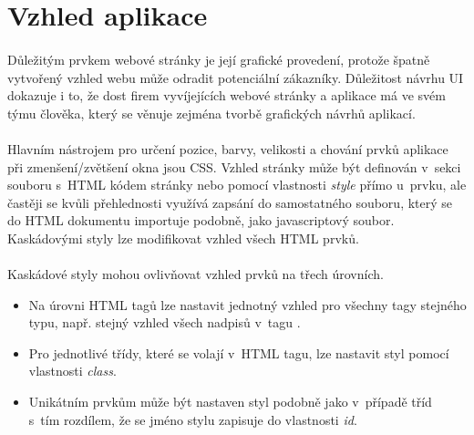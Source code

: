 \documentclass[11pt,a4paper,titlepage,oneside]{book}
\begin{document}

	\section{Vzhled aplikace}



		\paragraph{} Důležitým prvkem webové stránky je její grafické provedení, protože špatně vytvořený vzhled webu může odradit potenciální zákazníky. Důležitost návrhu \ac{UI} dokazuje i to, že dost firem vyvíjejících webové stránky a aplikace má ve svém týmu člověka, který se věnuje zejména tvorbě grafických návrhů aplikací.


		\paragraph{} Hlavním nástrojem pro určení pozice, barvy, velikosti a chování prvků aplikace při zmenšení/zvětšení okna jsou \ac{CSS}. Vzhled stránky může být definován v~sekci  souboru s~HTML kódem stránky nebo pomocí vlastnosti \textit{style} přímo u~prvku, ale častěji se kvůli přehlednosti využívá zapsání do samostatného souboru, který se do HTML dokumentu importuje podobně, jako javascriptový soubor. Kaskádovými styly lze modifikovat vzhled všech HTML prvků. 



		\paragraph{} Kaskádové styly mohou ovlivňovat vzhled prvků na třech úrovních.
				\begin{itemize}
					\item Na úrovni \ac{HTML} tagů lze nastavit jednotný vzhled pro všechny tagy stejného typu, např. stejný vzhled všech nadpisů v~tagu .
					\item Pro jednotlivé třídy, které se volají v~\ac{HTML} tagu, lze nastavit styl pomocí vlastnosti \textit{class}.
					\item Unikátním prvkům může být nastaven styl podobně jako v~případě tříd s~tím rozdílem, že se jméno stylu zapisuje do vlastnosti \textit{id}.
				\end{itemize}
\end{document}
